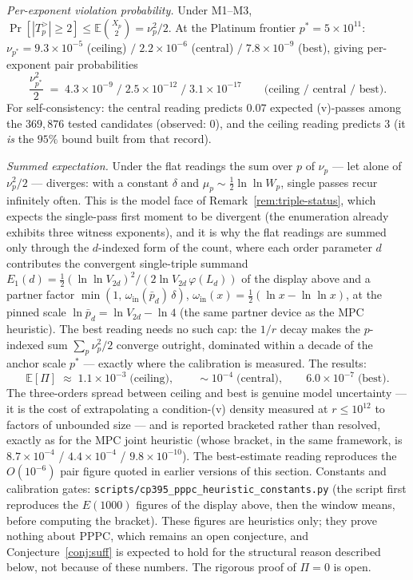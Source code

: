 \documentclass[11pt]{amsart}
\theoremstyle{plain}
\theoremstyle{definition}
\theoremstyle{remark}
\numberwithin{equation}{section}
\newcommand{\Prob}{\operatorname{Pr}}
\begin{document}
\emph{Per-exponent violation probability.} Under M1--M3,
$\Prob[|T_p^{>}| \geq 2] \leq \mathbb{E}\binom{X_p}{2} = \nu_p^2/2$. At
the Platinum frontier $p^\ast = 5 \times 10^{11}$:
$\nu_{p^\ast} = 9.3 \times 10^{-5}$ (ceiling) $/\; 2.2 \times 10^{-6}$
(central) $/\; 7.8 \times 10^{-9}$ (best), giving per-exponent pair
probabilities
\[
  \frac{\nu_{p^\ast}^2}{2} \;=\;
  4.3 \times 10^{-9} \;\big/\; 2.5 \times 10^{-12} \;\big/\;
  3.1 \times 10^{-17}
  \qquad \text{(ceiling / central / best)}.
\]
For self-consistency: the central reading predicts $0.07$ expected
(v)-passes among the $369{,}876$ tested candidates (observed: $0$), and
the ceiling reading predicts $3$ (it \emph{is} the $95\%$ bound built
from that record).

\emph{Summed expectation.} Under the flat readings the sum over $p$ of
$\nu_p$ --- let alone of $\nu_p^2/2$ --- diverges: with a constant
$\delta$ and $\mu_p \sim \tfrac12 \ln\ln W_p$, single passes recur
infinitely often. This is the model face of
Remark~\ref{rem:triple-status}, which expects the single-pass first
moment to be divergent (the enumeration already exhibits three witness
exponents), and it is why the flat readings are summed only through the
$d$-indexed form of the count, where each order parameter $d$
contributes the convergent single-triple summand $E_1(d) = \tfrac12
(\ln\ln V_{2d})^2 / (2 \ln V_{2d}\, \varphi(L_d))$ of the display above
and a partner factor $\min(1,\, \omega_{\mathrm{in}}(\bar p_d)\,
\delta)$, $\omega_{\mathrm{in}}(x) = \tfrac12(\ln x - \ln\ln x)$, at the
pinned scale $\ln \bar p_d = \ln V_{2d} - \ln 4$ (the same partner
device as the MPC heuristic). The best reading needs no such cap: the
$1/r$ decay makes the $p$-indexed sum $\sum_p \nu_p^2/2$ converge
outright, dominated within a decade of the anchor scale $p^\ast$ ---
exactly where the calibration is measured. The results:
\[
  \mathbb{E}[\Pi] \;\approx\;
  1.1 \times 10^{-3} \;\text{(ceiling)}, \qquad
  \sim 10^{-4} \;\text{(central)}, \qquad
  6.0 \times 10^{-7} \;\text{(best)}.
\]
The three-orders spread between ceiling and best is genuine model
uncertainty --- it is the cost of extrapolating a condition-(v) density
measured at $r \leq 10^{12}$ to factors of unbounded size --- and is
reported bracketed rather than resolved, exactly as for the MPC joint
heuristic (whose bracket, in the same framework, is $8.7 \times 10^{-4}$
/ $4.4 \times 10^{-4}$ / $9.8 \times 10^{-10}$). The best-estimate
reading reproduces the $O(10^{-6})$ pair figure quoted in earlier
versions of this section. Constants and calibration gates:
\texttt{scripts/cp395\_pppc\_heuristic\_constants.py} (the script first
reproduces the $E(1000)$ figures of the display above, then the window
means, before computing the bracket). These figures are heuristics only;
they prove nothing about PPPC, which remains an open conjecture, and
Conjecture~\ref{conj:suff} is expected to hold for the structural reason
described below, not because of these numbers.
The rigorous proof of $\Pi = 0$ is open.
\end{document}
